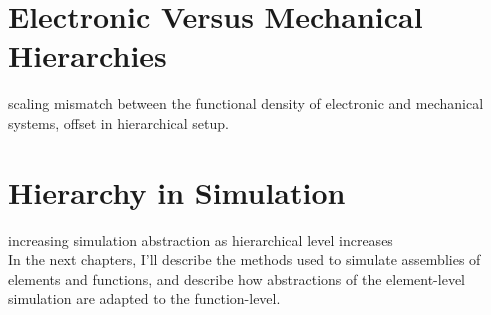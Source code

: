 {\section{Electronic Versus Mechanical Hierarchies}

scaling mismatch between the functional density of electronic and mechanical systems, offset in hierarchical setup.

\section{Hierarchy in Simulation}

increasing simulation abstraction as hierarchical level increases\\

In the next chapters, I'll describe the methods used to simulate assemblies of elements and functions, and describe how abstractions of the element-level simulation are adapted to the function-level.



}
